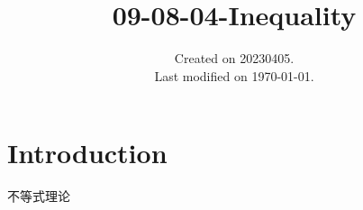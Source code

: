 \documentclass[UTF8]{../../09-Mathematics}
\begin{document}
\title{09-08-04-Inequality}
\date{Created on 20230405.\\   Last modified on \today.}
\maketitle
\tableofcontents


\chapter{Introduction}

不等式理论
\end{document}
